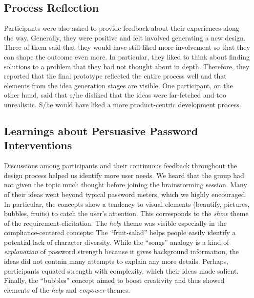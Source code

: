 \subsection{Process Reflection}
Participants were also asked to provide feedback about their experiences along the way. Generally, they were positive and felt involved generating a new design. Three of them said that they would have still liked more involvement so that they can shape the outcome even more. In particular, they liked to think about finding solutions to a problem that they had not thought about in depth. Therefore, they reported that the final prototype reflected the entire process well and that elements from the idea generation stages are visible. One participant, on the other hand, said that s/he disliked that the ideas were far-fetched and too unrealistic. S/he would have liked a more product-centric development process.

\subsection{Learnings about Persuasive Password Interventions}
Discussions among participants and their continuous feedback throughout the design process helped us identify more user needs. We heard that the group had not given the topic much thought before joining the brainstorming session. Many of their ideas went beyond typical password meters, which we highly encouraged. In particular, the concepts show a tendency to visual elements (beautify, pictures, bubbles, fruits) to catch the user's attention. This corresponds to the \textit{show} theme of the requirement-elicitation. The \textit{help} theme was visible especially in the compliance-centered concepts: The ``fruit-salad'' helps people easily identify a potential lack of character diversity. 
While the ``songs'' analogy is a kind of \textit{explanation} of password strength because it gives background information, the ideas did not contain many attempts to explain any more details. Perhaps, participants equated strength with complexity, which their ideas made salient. Finally, the ``bubbles'' concept aimed to boost creativity and thus showed elements of the \textit{help} and \textit{empower} themes. 


